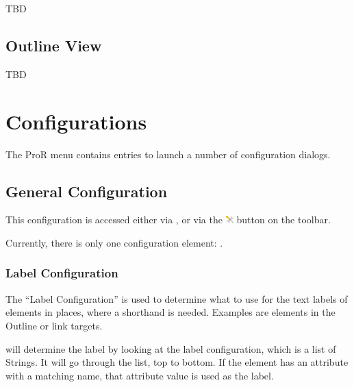 {{{TBD

\subsection{Outline View}

TBD

\section{Configurations}

The ProR menu contains entries to launch a number of configuration
dialogs.

\subsection{General Configuration}
\label{sec:general_configuration}

This configuration is accessed either via , or
via the \includegraphics[height=0.8em]{../rmf-images/ReqIFUIToolExtension.png} button on the toolbar.

Currently, there is only one configuration element: .

\subsubsection{Label Configuration}

The ``Label Configuration'' is used to determine what to use for the text labels of elements
in places, where a shorthand is needed.  Examples are elements in the Outline or link targets.

\pror{} will determine the label by looking at the label configuration, which is a list of Strings.
It will go through the list, top to bottom.  If the element has an attribute with a matching name,
that attribute value is used as the label.

}}}
